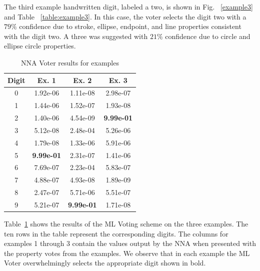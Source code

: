 \documentclass[conference]{IEEEtran}
\begin{document}
The third example handwritten digit, labeled a two, is shown in Fig. ~\ref{example3} and Table ~\ref{table:example3}.  In this case,  the voter selects the digit two with a $79\%$ confidence due to stroke, ellipse, endpoint, and line properties consistent with the digit two.  A three was suggested with $21\%$ confidence due to circle and ellipse circle properties.

\begin{table}[htbp]
\caption{NNA Voter results for examples}
\centering
\begin{tabular}{| c | c | c | c |}
\hline
 Digit & Ex. 1 & Ex. 2 & Ex. 3 \\
\hline\hline
0 & 1.92e-06 & 1.11e-08 & 2.98e-07\\ 
\hline
1 & 1.44e-06 & 1.52e-07 & 1.93e-08 \\
\hline
2 & 1.40e-06 & 4.54e-09 & \textbf{9.99e-01} \\
\hline
3 & 5.12e-08 & 2.48e-04 & 5.26e-06 \\
\hline
4 & 1.79e-08 & 1.33e-06 & 5.91e-06 \\
\hline
5 & \textbf{9.99e-01} & 2.31e-07 & 1.41e-06 \\
\hline
6 & 7.69e-07 & 2.23e-04 & 5.83e-07 \\
\hline
7 & 4.88e-07 & 4.93e-08 & 1.89e-09 \\
\hline
8 & 2.47e-07 & 5.71e-06 & 5.51e-07 \\
\hline
9 & 5.21e-07 & \textbf{9.99e-01} & 1.71e-08 \\
\hline
\end{tabular}
\label{table:nnavoter}
\end{table}

Table~\ref{table:nnavoter} shows the results of the ML Voting scheme on the three examples.  The ten rows in the table represent the corresponding digits.  The columns for examples 1 through 3 contain the values output by the NNA when presented with the property votes from the examples.  We observe that in each example the ML Voter overwhelmingly selects the appropriate digit shown in bold.
\end{document}
